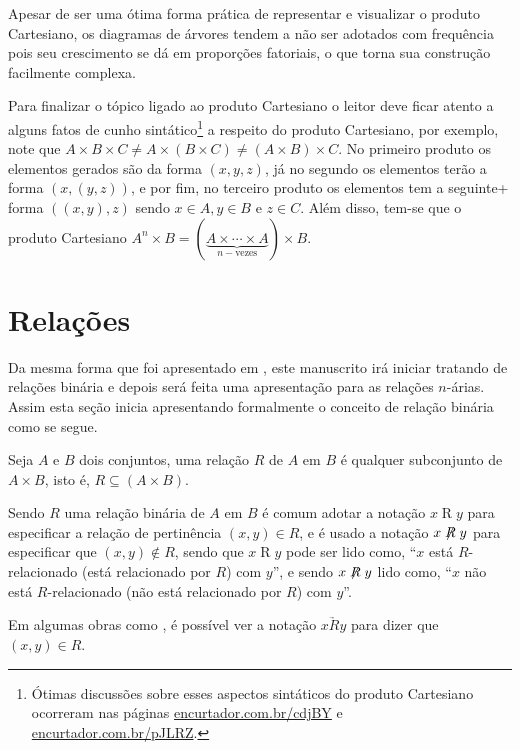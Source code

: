 Apesar de ser uma ótima forma prática de representar e visualizar o produto Cartesiano, os diagramas de árvores tendem a não ser adotados com frequência pois seu crescimento se dá em proporções fatoriais, o que torna sua construção facilmente complexa.

\begin{rema}
	Para finalizar o tópico ligado ao produto Cartesiano o leitor deve ficar atento a alguns fatos de cunho sintático\footnote{Ótimas discussões sobre esses aspectos sintáticos do produto Cartesiano ocorreram nas páginas \url{encurtador.com.br/cdjBY} e \url{encurtador.com.br/pJLRZ}.} a respeito do produto Cartesiano, por exemplo, note que $A \times B \times C \neq A \times (B \times C) \neq (A \times B) \times C$. No primeiro produto os elementos gerados são da forma $(x, y, z)$, já no segundo os elementos terão a forma $(x, (y, z))$, e por fim, no terceiro produto os elementos tem a seguinte+ forma $((x,y), z)$ sendo $x \in A, y \in B$ e $z \in C$. Além disso, tem-se que o produto Cartesiano $A^n \times B = (\underbrace{A \times \cdots \times A}_{n-\text{vezes}}) \times B$. 
\end{rema}

\section{Relações}\label{sec:Relacoes}

Da mesma forma que foi apresentado em \cite{abe1991-TC}, este manuscrito irá iniciar tratando de relações binária e depois será feita uma apresentação para as relações $n$-árias. Assim esta seção inicia apresentando formalmente o conceito de relação binária como se segue.

\begin{definition}\label{def:RelacaoBinaria}
	Seja $A$ e $B$ dois conjuntos, uma relação $R$ de $A$ em $B$ é qualquer subconjunto de $A \times B$, isto é, $R \subseteq (A \times B)$.
\end{definition}

Sendo $R$ uma relação binária de $A$ em $B$ é comum adotar a notação $x\mathrel{R}y$ para especificar a relação de pertinência $(x,y) \in R$, e é usado a notação $x\centernot{R}y$ para especificar que $(x,y) \notin R$, sendo que $x\mathrel{R}y$ pode ser lido como, ``$x$ está $R$-relacionado (está relacionado por $R$) com $y$'', e sendo  $x\centernot{R}y$ lido como, ``$x$ não está $R$-relacionado (não está relacionado por $R$) com $y$''.

\begin{rema}
	Em algumas obras como \cite{carmo2013}, é possível ver a notação $x \underrightarrow{R} y$ para dizer que $(x, y) \in R$.
\end{rema}

